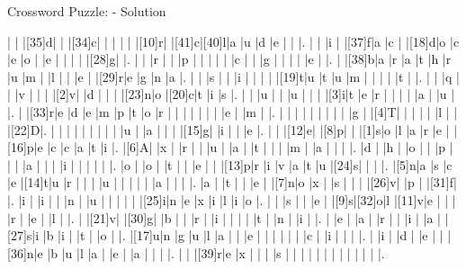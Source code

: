 \documentclass[12pt]{article}
\begin{document}
\newpage
\begin{center}
  \huge{Crossword Puzzle: - Solution}
\end{center}
\vspace{1.5cm}
\PuzzleSolution
\begin{Puzzle}{22}{24}
  |{}  |{}  |[35]d|{}  |{}  |[34]c|{}  |{}  |{}  |{}  |{}  |[10]r|{}  |[41]c|[40]l|a   |u   |d   |e   |{}  |{}  |.
  |{}  |{}  |i   |{}  |[37]f|a   |c   |{}  |[18]d|o   |c   |e   |o   |{}  |e   |{}  |{}  |{}  |{}  |[28]g|{}  |.
  |{}  |{}  |r   |{}  |{}  |p   |{}  |{}  |{}  |{}  |{}  |c   |{}  |{}  |g   |{}  |{}  |{}  |{}  |e   |{}  |.
  |{}  |[38]b|a   |r   |a   |t   |h   |r   |u   |m   |{}  |l   |{}  |{}  |e   |{}  |[29]r|e   |g   |n   |a   |.
  |{}  |{}  |s   |{}  |{}  |i   |{}  |{}  |{}  |{}  |[19]t|u   |t   |u   |m   |{}  |{}  |{}  |{}  |t   |{}  |.
  |{}  |{}  |q   |{}  |{}  |v   |{}  |{}  |{}  |[2]v|{}  |d   |{}  |{}  |{}  |[23]n|o   |[20]c|t   |i   |s   |.
  |{}  |{}  |u   |{}  |{}  |u   |{}  |{}  |{}  |[3]i|t   |e   |r   |{}  |{}  |{}  |{}  |a   |{}  |u   |{}  |.
  |{}  |[33]r|e   |d   |e   |m   |p   |t   |o   |r   |{}  |{}  |{}  |{}  |{}  |{}  |{}  |e   |{}  |m   |{}  |.
  |{}  |{}  |{}  |{}  |{}  |{}  |{}  |{}  |{}  |g   |{}  |[4]T|{}  |{}  |{}  |{}  |{}  |l   |{}  |{}  |[22]D|.
  |{}  |{}  |{}  |{}  |{}  |{}  |{}  |{}  |{}  |u   |{}  |a   |{}  |{}  |{}  |[15]g|{}  |i   |{}  |{}  |e   |.
  |{}  |{}  |[12]e|{}  |[8]p|{}  |{}  |[1]s|o   |l   |a   |r   |e   |{}  |[16]p|e   |c   |c   |a   |t   |i   |.
  |[6]A|{}  |x   |{}  |r   |{}  |{}  |u   |{}  |a   |{}  |t   |{}  |{}  |{}  |m   |{}  |a   |{}  |{}  |{}  |.
  |d   |{}  |h   |{}  |o   |{}  |{}  |p   |{}  |{}  |{}  |a   |{}  |{}  |{}  |i   |{}  |{}  |{}  |{}  |{}  |.
  |o   |{}  |o   |{}  |t   |{}  |{}  |e   |{}  |{}  |[13]p|r   |i   |v   |a   |t   |u   |[24]s|{}  |{}  |{}  |.
  |[5]n|a   |s   |c   |e   |[14]t|u   |r   |{}  |{}  |{}  |u   |{}  |{}  |{}  |{}  |{}  |a   |{}  |{}  |{}  |.
  |a   |{}  |t   |{}  |{}  |e   |{}  |[7]n|o   |x   |{}  |s   |{}  |{}  |{}  |[26]v|{}  |p   |{}  |[31]f|{}  |.
  |i   |{}  |i   |{}  |{}  |n   |{}  |u   |{}  |{}  |{}  |{}  |{}  |[25]i|n   |e   |x   |i   |l   |i   |o   |.
  |{}  |{}  |s   |{}  |{}  |e   |{}  |[9]s|[32]o|l   |[11]v|e   |{}  |{}  |{}  |r   |{}  |e   |{}  |l   |{}  |.
  |{}  |[21]v|{}  |[30]g|{}  |b   |{}  |{}  |r   |{}  |i   |{}  |{}  |{}  |{}  |t   |{}  |n   |{}  |i   |{}  |.
  |{}  |e   |{}  |a   |{}  |r   |{}  |{}  |i   |{}  |a   |{}  |[27]s|i   |b   |i   |{}  |t   |{}  |o   |{}  |.
  |[17]u|n   |g   |u   |l   |a   |{}  |{}  |e   |{}  |{}  |{}  |{}  |{}  |{}  |c   |{}  |i   |{}  |{}  |{}  |.
  |{}  |i   |{}  |d   |{}  |e   |{}  |{}  |[36]n|e   |b   |u   |l   |a   |{}  |e   |{}  |a   |{}  |{}  |{}  |.
  |{}  |{}  |[39]r|e   |x   |{}  |{}  |{}  |s   |{}  |{}  |{}  |{}  |{}  |{}  |{}  |{}  |{}  |{}  |{}  |{}  |.
\end{Puzzle}
\end{document}
